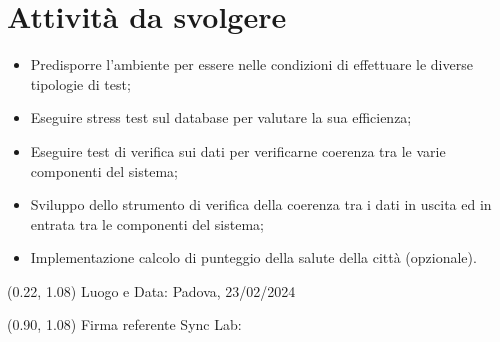 \documentclass{article}
\begin{document}
\section{Attività da svolgere}
    \begin{itemize}
        \item Predisporre l'ambiente per essere nelle condizioni di effettuare le diverse tipologie di test;
        \item Eseguire stress test sul database per valutare la sua efficienza;
        \item Eseguire test di verifica sui dati per verificarne coerenza tra le varie componenti del sistema;
        \item Sviluppo dello strumento di verifica della coerenza tra i dati in uscita ed in entrata tra le componenti del sistema;
        \item Implementazione calcolo di punteggio della salute della città (opzionale).
    \end{itemize}

\begin{textblock*}{\textwidth}(0.22\textwidth, 1.08\textheight)
    Luogo e Data: Padova, 23/02/2024
\end{textblock*}

\begin{textblock*}{\textwidth}(0.90\textwidth, 1.08\textheight)
        Firma referente Sync Lab:
\end{textblock*}
\end{document}
